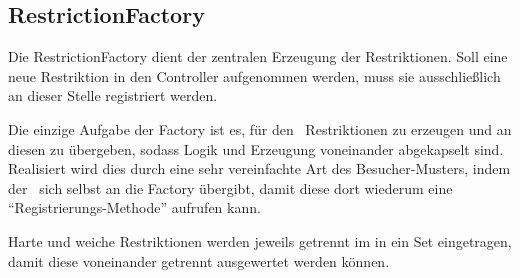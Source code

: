 \subsection{RestrictionFactory}\label{subsec:RestrictionFactory}
Die RestrictionFactory dient der zentralen Erzeugung der Restriktionen.
Soll eine neue Restriktion in den Controller aufgenommen werden, muss sie ausschließlich an dieser Stelle
registriert werden.

Die einzige Aufgabe der Factory ist es, für den~ Restriktionen
zu erzeugen und an diesen zu übergeben, sodass Logik und Erzeugung voneinander abgekapselt sind.
Realisiert wird dies durch eine sehr vereinfachte Art des Besucher-Musters, indem der~
sich selbst an die Factory übergibt, damit diese dort wiederum eine \enquote{Registrierungs-Methode} aufrufen kann.

Harte und weiche Restriktionen werden jeweils getrennt im  in ein
Set eingetragen, damit diese voneinander getrennt ausgewertet werden können.